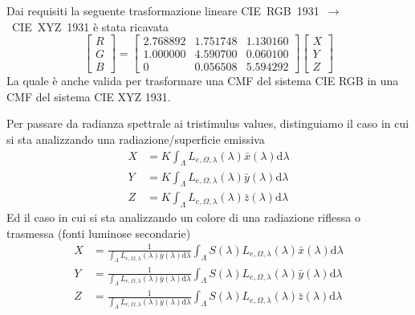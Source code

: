 Dai requisiti la seguente trasformazione lineare \mbox{CIE RGB 1931 $\rightarrow$ CIE XYZ 1931} \`e stata ricavata
\begin{equation}\label{chapter2:colorimetry:RGB2XYZ}
	\begin{bmatrix}
		R \\ G \\ B
	\end{bmatrix}
	=
	\begin{bmatrix}
		2.768892 & 1.751748 & 1.130160 \\
		1.000000 & 4.590700 & 0.060100 \\
		0 & 0.056508 & 5.594292
	\end{bmatrix}
	\begin{bmatrix}
		X \\ Y \\ Z
	\end{bmatrix}
\end{equation}
La quale \`e anche valida per trasformare una CMF del sistema CIE RGB in una CMF del sistema CIE XYZ 1931.\par
Per passare da radianza spettrale ai tristimulus values, distinguiamo il caso in cui si sta analizzando una radiazione/superficie emissiva
\begin{align}\label{chapter2:colorimetry:spectrum2XYZ4Source}
	X &= K\int_\Lambda L_{e,\Omega,\lambda}(\lambda)\bar{x}(\lambda)\mathrm{d}\lambda\\
	Y &= K\int_\Lambda L_{e,\Omega,\lambda}(\lambda)\bar{y}(\lambda)\mathrm{d}\lambda\\
	Z &= K\int_\Lambda L_{e,\Omega,\lambda}(\lambda)\bar{z}(\lambda)\mathrm{d}\lambda
\end{align}
Ed il caso in cui si sta analizzando un colore di una radiazione riflessa o trasmessa (fonti luminose secondarie)
\begin{align}
	X &= \frac{1}{\int_\Lambda L_{e,\Omega,\lambda}(\lambda)\bar{y}(\lambda)\mathrm{d}\lambda}
		\int_\Lambda S(\lambda)L_{e,\Omega,\lambda}(\lambda)\bar{x}(\lambda)\mathrm{d}\lambda\\
	Y &= \frac{1}{\int_\Lambda L_{e,\Omega,\lambda}(\lambda)\bar{y}(\lambda)\mathrm{d}\lambda}
		\int_\Lambda S(\lambda)L_{e,\Omega,\lambda}(\lambda)\bar{y}(\lambda)\mathrm{d}\lambda\\
	Z &= \frac{1}{\int_\Lambda L_{e,\Omega,\lambda}(\lambda)\bar{y}(\lambda)\mathrm{d}\lambda}
		\int_\Lambda S(\lambda)L_{e,\Omega,\lambda}(\lambda)\bar{z}(\lambda)\mathrm{d}\lambda\\
\end{align}
